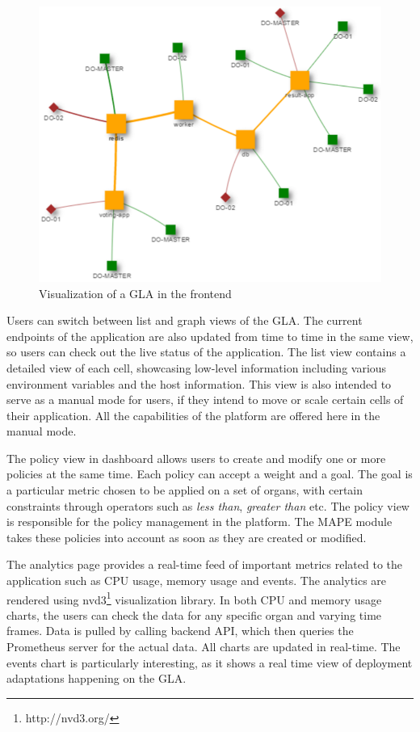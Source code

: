 \documentclass{seal_thesis}
\begin{document}
\begin{figure}[!ht]
\centering
	\includegraphics[width=\textwidth]{gla.png}
	\caption{Visualization of a GLA in the frontend}
	\label{fig:examplegla}
\end{figure}

Users can switch between list and graph views of the GLA. 
The current endpoints of the application are also updated from time to time in the same view, so users can check out the live status of the application. 
The list view contains a detailed view of each cell, showcasing low-level information including various environment variables and the host information. 
This view is also intended to serve as a manual mode for users, if they intend to move or scale certain cells of their application. 
All the capabilities of the platform are offered here in the manual mode. 

The policy view in dashboard allows users to create and modify one or more policies at the same time. 
Each policy can accept a weight and a goal. 
The goal is a particular metric chosen to be applied on a set of organs, with certain constraints through operators such as \textit{less than}, \textit{greater than} etc. 
The policy view is responsible for the policy management in the platform. 
The MAPE module takes these policies into account as soon as they are created or modified. 

The analytics page provides a real-time feed of important metrics related to the application such as CPU usage, memory usage and events. 
The analytics are rendered using nvd3\footnote{http://nvd3.org/} visualization library. 
In both CPU and memory usage charts, the users can check the data for any specific organ and varying time frames. 
Data is pulled by calling backend API, which then queries the Prometheus server for the actual data. 
All charts are updated in real-time. 
The events chart is particularly interesting, as it shows a real time view of deployment adaptations happening on the GLA. 
\end{document}
